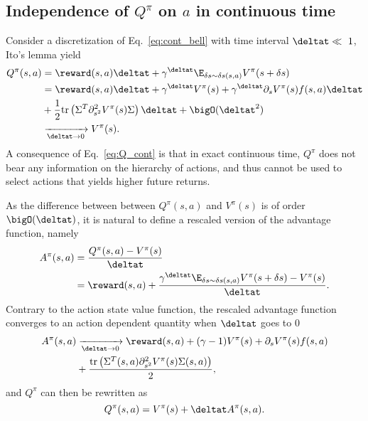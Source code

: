 \subsection{Independence of $Q^\pi$ on $a$ in continuous time}
Consider a discretization of Eq.~\eqref{eq:cont_bell} with time interval
$\deltat \ll~1$, Ito's lemma yield
\begin{align}
	Q^\pi(s, a) &= \reward(s, a) \deltat + \gamma^{\deltat} \E_{\delta s \sim \delta s(s, a)}V^\pi(s + \delta s)\nonumber\\
		    &= \reward(s, a) \deltat + \gamma^{\deltat} V^\pi(s) +
		     \gamma^{\deltat} \partial_s V^\pi(s)f(s, a) \deltat\nonumber\\
		    &+ \frac{1}{2}\text{tr}\left(\Sigma^T\partial^2_{s^2}V^\pi(s)\Sigma\right)\deltat + \bigO(\deltat^2)\nonumber\\
		    &\xrightarrow[\deltat \to 0]{} V^\pi(s).
		    \label{eq:Q_cont}
\end{align}
A consequence of Eq.~\eqref{eq:Q_cont} is that in exact continuous time,
$Q^\pi$ does not bear any information on the hierarchy of actions, and
thus cannot be used to select actions that yields higher future returns.

As the difference between between $Q^\pi(s, a)$ and $V^\pi(s)$ is of order
$\bigO(\deltat)$, it is natural to define a rescaled version of the advantage
function, namely
\begin{align}
	A^\pi(s, a) &= \frac{Q^\pi(s,a) - V^\pi(s)}{\deltat}\\
		    &= \reward(s, a) +
		    \frac{\gamma^{\deltat} \E_{\delta s \sim \delta s(s, a)} V^\pi(s + \delta s) - V^\pi(s)}{\deltat}.
    \label{eq:adv}
\end{align}
Contrary to the action state value function, the rescaled advantage function converges
to an action dependent quantity when $\deltat$ goes to $0$
\begin{align}
	A^\pi(s, a) &\xrightarrow[\deltat \to 0]{} \reward(s, a) +
	(\gamma - 1) V^\pi(s) + \partial_s V^\pi(s) f(s, a)\nonumber\\
		    &+
	\frac{\text{tr}\left(\Sigma^T(s, a)\partial^2_{s^2}V^\pi(s) \Sigma(s,a)\right)}{2},
\end{align}
and $Q^\pi$ can then be rewritten as
\begin{equation}
	Q^\pi(s, a) = V^\pi(s) + \deltat A^\pi(s, a).
	\label{eq:reparam_q_pi}
\end{equation}

